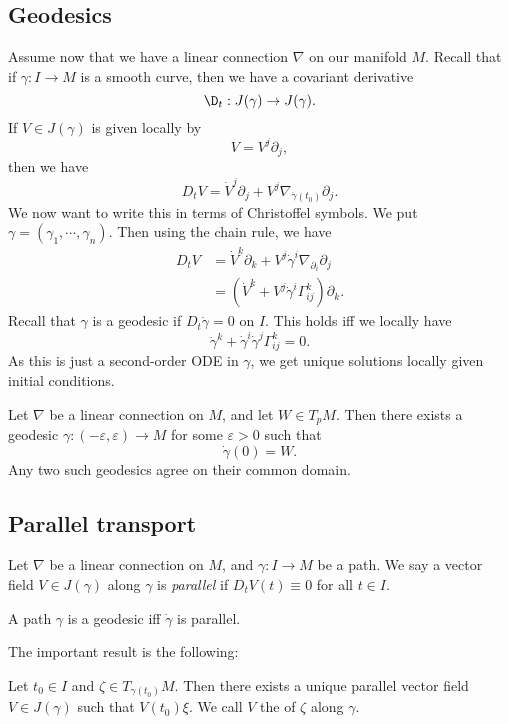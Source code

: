 \documentclass[a4paper]{article}
\begin{document}
\subsection{Geodesics}
Assume now that we have a linear connection $\nabla$ on our manifold $M$. Recall that if $\gamma: I \to M$ is a smooth curve, then we have a covariant derivative
\[
  \D_t: J(\gamma) \to J(\gamma).
\]
If $V \in J(\gamma)$ is given locally by
\[
  V = V^j \partial_j,
\]
then we have
\[
  D_t V = \dot{V}^j \partial_j + V^j \nabla_{\dot{\gamma}(t_0)} \partial_j.
\]
We now want to write this in terms of Christoffel symbols. We put $\gamma = (\gamma_1, \cdots, \gamma_n)$. Then using the chain rule, we have
\begin{align*}
  D_t V &= \dot{V}^k \partial_k + V^j \dot{\gamma}^i \nabla_{\partial_i} \partial_j\\
  &= (\dot{V}^k + V^j \dot{\gamma}^i \Gamma_{ij}^k)\partial_k.
\end{align*}
Recall that $\gamma$ is a geodesic if $D_t \dot{\gamma} = 0$ on $I$. This holds iff we locally have
\[
  \ddot{\gamma}^k + \dot{\gamma}^i \dot{\gamma}^j \Gamma_{ij}^k = 0.
\]
As this is just a second-order ODE in $\gamma$, we get unique solutions locally given initial conditions.\
\begin{thm}
  Let $\nabla$ be a linear connection on $M$, and let $W \in T_pM$. Then there exists a geodesic $\gamma: (-\varepsilon, \varepsilon) \to M$ for some $\varepsilon > 0$ such that
  \[
    \dot{\gamma}(0) = W.
  \]
  Any two such geodesics agree on their common domain.
\end{thm}

\subsection{Parallel transport}
\begin{defi}[Parallel vector field]
  Let $\nabla$ be a linear connection on $M$, and $\gamma: I \to M$ be a path. We say a vector field $V \in J(\gamma)$ along $\gamma$ is \emph{parallel} if $D_t V(t) \equiv 0$ for all $t \in I$.
\end{defi}

\begin{eg}
  A path $\gamma$ is a geodesic iff $\dot{\gamma}$ is parallel.
\end{eg}
The important result is the following:
\begin{lemma}
  Let $t_0 \in I$ and $\zeta \in T_{\gamma(t_0)} M$. Then there exists a unique parallel vector field $V \in J(\gamma)$ such that $V(t_0) \xi$. We call $V$ the  of $\zeta$ along $\gamma$.
\end{lemma}
\end{document}
